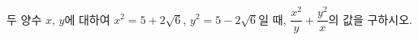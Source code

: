 두 양수 $x$, $y$에 대하여 $x^2=5+2\sqrt{6}$, $y^2=5-2\sqrt{6}$일 때, $\dfrac{x^2}{y}+\dfrac{y^2}{x}$의 값을 구하시오.
